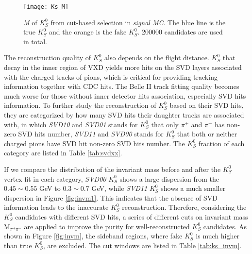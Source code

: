 \begin{figure}[ht]
	\centering 
	\texttt{[image: Ks\_M]}
	\caption{\textit{M} of $K_S^0$ from cut-based selection in \textit{signal MC}. The blue line is the true $K_S^0$ and the orange is the fake $K_S^0$. 200000 candidates are used in total. }
	\label{fig:ksM_sigmc}
\end{figure}
\begin{comment}
The $K_S^0$ candidates from ``stdKshort:merged" is the default way to obtain $K_S^0$ in the current BASF2, 
however, the limitation of this cut-based $K_S^0$ reconstruction is the pollution from fake $K_S^0$. Using these $K_S^0$ candidates to reconstruct $B^0 \to K_S^0  K_S^0  K_S^0$, as long as one of three $K_S^0$ is fake, the reconstructed $B^0$ is fake, too. 
\end{comment}

The reconstruction quality of $K_S^0$ also depends on the flight distance. $K_S^0$ that decay in the inner region of VXD yields more hits on the SVD layers associated with the charged tracks of pions, which is critical for providing tracking information together with CDC hits. The Belle II track fitting quality becomes much worse for those without inner detector hits association, especially SVD hits information. To further study the reconstruction of $K_S^0$ based on their SVD hits, they are categorized by how many SVD hits their daughter tracks are associated with, in which \textit{SVD10} and \textit{SVD01} stands for $K_S^0$ that only $\pi^+$ and $\pi^-$ has non-zero SVD hits number, \textit{SVD11} and \textit{SVD00} stands for $K_S^0$ that both or neither charged pions have SVD hit non-zero SVD hits number. The $K_S^0$ fraction of each category are listed in Table \ref{tab:svdxx}. 
 
If we compare the distribution of the invariant mass before and after the $K_S^0$ vertex fit in each category, \textit{SVD00} $K_S^0$ shows a large dispersion from the $0.45 \sim 0.55$ GeV to $0.3\sim 0.7$ GeV, while \textit{SVD11} $K_S^0$ shows a much smaller dispersion in Figure \ref{fig:invm1}. This indicates that the absence of SVD information leads to the inaccurate $K_S^0$ reconstruction. Therefore, considering the $K_S^0$ candidates with different SVD hits, a series of different cuts on invariant mass M$_{\pi^+\pi^-}$ are applied to improve the purity for well-reconstructed $K_S^0$ candidates. As shown in Figure \ref{fig:invm}, the sideband regions, where fake $K_S^0$ is much higher than true $K_S^0$, are excluded. The cut windows are listed in Table \ref{tab:ks_invm}. 
 
